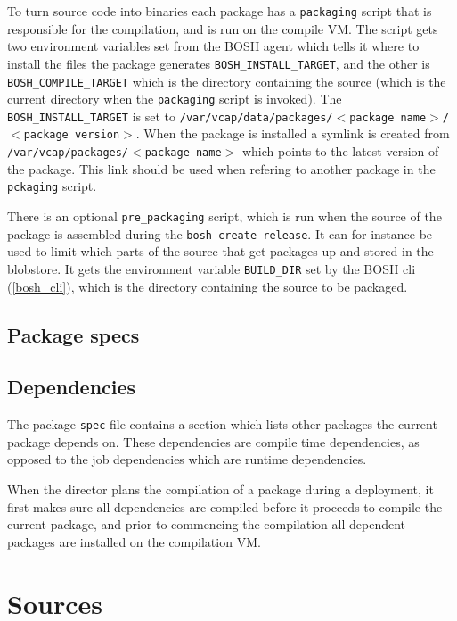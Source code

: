 To turn source code into binaries each package has a \texttt{packaging} script that is responsible for the compilation, and is run on the compile VM. The script gets two environment variables set from the BOSH agent which tells it where to install the files the package generates \texttt{BOSH\_INSTALL\_TARGET}, and the other is \texttt{BOSH\_COMPILE\_TARGET} which is the directory containing the source (which is the current directory when the \texttt{packaging} script is invoked). The \texttt{BOSH\_INSTALL\_TARGET} is set to \texttt{\slash var\slash vcap\slash data\slash packages\slash $<$package name$>$\slash $<$package version$>$}. When the package is installed a symlink is created from \texttt{\slash var\slash vcap\slash packages\slash $<$package name$>$} which points to the latest version of the package. This link should be used when refering to another package in the \texttt{pckaging} script.

There is an optional \texttt{pre\_packaging} script, which is run when the source of the package is assembled during the \texttt{bosh create release}. It can for instance be used to limit which parts of the source that get packages up and stored in the blobstore. It gets the environment variable \texttt{BUILD\_DIR} set by the BOSH cli (\autoref{bosh_cli}), which is the directory containing the source to be packaged.

\subsection{Package specs}
\label{packagespecs}

\subsection{Dependencies}
\label{dependencies}

The package \texttt{spec} file contains a section which lists other packages the current package depends on. These dependencies are compile time dependencies, as opposed to the job dependencies which are runtime dependencies.

When the director plans the compilation of a package during a deployment, it first makes sure all dependencies are compiled before it proceeds to compile the current package, and prior to commencing the compilation all dependent packages are installed on the compilation VM.

\section{Sources}
\label{sources}

